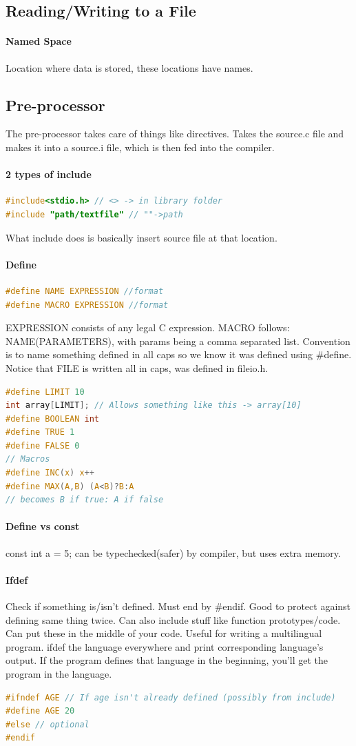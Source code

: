 \documentclass[12 pt]{article}
\begin{document}
\subsection{Reading/Writing to a File}

\paragraph{Named Space}
Location where data is stored, these locations have names.
\subsection{Pre-processor}
The pre-processor takes care of things like directives. Takes the source.c file and makes it into a source.i file, which is then fed into the compiler.
\paragraph{2 types of include}
\begin{lstlisting}[language=c]
#include<stdio.h> // <> -> in library folder
#include "path/textfile" // ""->path
\end{lstlisting}
What include does is basically insert source file at that location.
\paragraph{Define}
\begin{lstlisting}[language=c]
#define NAME EXPRESSION //format
#define MACRO EXPRESSION //format
\end{lstlisting}
EXPRESSION consists of any legal C expression. MACRO follows: NAME(PARAMETERS), with params being a comma separated list. Convention is to name something defined in all caps so we know it was defined using \#define. Notice that FILE is written all in caps, was defined in fileio.h. 
\begin{lstlisting}[language=c]
#define LIMIT 10
int array[LIMIT]; // Allows something like this -> array[10]
#define BOOLEAN int
#define TRUE 1
#define FALSE 0
// Macros
#define INC(x) x++
#define MAX(A,B) (A<B)?B:A
// becomes B if true: A if false
\end{lstlisting}
\paragraph{Define vs const} const int a = 5; can be typechecked(safer) by compiler, but uses extra memory.
\paragraph{Ifdef} Check if something is/isn't defined. Must end by \#endif. Good to protect against defining same thing twice. Can also include stuff like function prototypes/code. Can put these in the middle of your code. Useful for writing a multilingual program. ifdef the language everywhere and print corresponding language's output. If the program defines that language in the beginning, you'll get the program in the language.
\begin{lstlisting}[language=c]
#ifndef AGE // If age isn't already defined (possibly from include)
#define AGE 20
#else // optional
#endif
\end{lstlisting}
\end{document}
